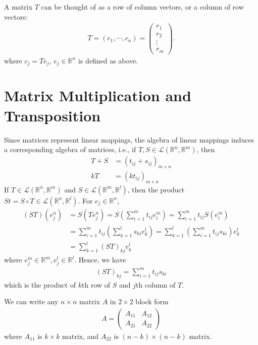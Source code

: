 \documentclass[11pt]{book}
\theoremstyle{definition}
\numberwithin{equation}{subsection}
\begin{document}
A matrix $T$ can be thought of as a row of column vectors, or a column of row vectors: 
\begin{align*}
    T = (c_1,\cdots,c_n) = \left(
    \begin{matrix}
        r_1 \\
        r_2 \\
        \vdots \\
        r_m 
        \end{matrix}
    \right).
\end{align*}
where $c_j = T e_j$, $e_j\in\mathbb{R}^n$ is defined as above.

\medskip
\section{Matrix Multiplication and Transposition}
Since matrices represent linear mappings, the algebra of linear mappings induces a corresponding algebra of matrices, i.e., if $T,S\in \mathscr{L}(\mathbb{R}^n,\mathbb{R}^m)$, then
\begin{align*}
    T+S &= (t_{ij} + s_{ij})_{m\times n}\\
    k T &= (kt_{ij})_{m\times n}
\end{align*}
If $T\in \mathscr{L}(\mathbb{R}^n,\mathbb{R}^m)$ and $S\in \mathscr{L}(\mathbb{R}^m,\mathbb{R}^l)$, then the product $St = S\circ T \in \mathscr{L}(\mathbb{R}^n,\mathbb{R}^l)$. For $e_j\in\mathbb{R}^n$,
\begin{align*}
    (ST)(e_j^n) & = S(Te_j^n) = S\left(\sum^m_{i=1}t_{ij}e^m_i\right) = \sum^m_{i=1}t_{ij} S(e^m_i) \\
    & = \sum^m_{i=1}t_{ij} \left(\sum^l_{k=1}s_{ki}e^l_k\right) = \sum^l_{k=1}\left(\sum^m_{i=1}t_{ij}s_{ki}\right)e^l_k \\
    & = \sum^l_{k=1}(ST)_{kj} e^l_k
\end{align*}
where $e_j^m\in\mathbb{R}^m,e_j^l\in\mathbb{R}^l$. Hence, we have 
\begin{align*}
    (ST)_{kj} = \sum^m_{i=1}t_{ij}s_{ki}
\end{align*}
which is the product of $k$th row of $S$ and $j$th column of $T$.

We can write any $n\times n$ matrix $A$ in $2\times 2$ block form
\begin{align*}
    A = \left(
        \begin{matrix}
        A_{11} & A_{12} \\
        A_{21} & A_{22} 
        \end{matrix}
    \right)
\end{align*}
where $A_{11}$ is $k\times k$ matrix, and $A_{22}$ is $(n-k)\times(n-k)$ matrix. 
\end{document}
